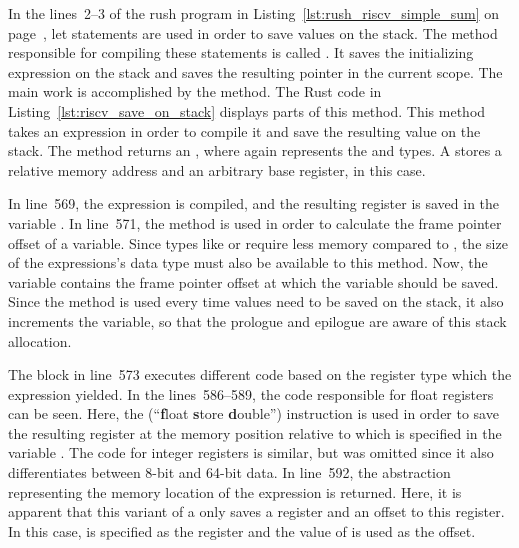 In the lines~2--3 of the rush program in Listing~\ref{lst:rush_riscv_simple_sum} on page~\pageref{lst:rush_riscv_simple_sum}, let statements are used in order to save values on the stack.
The method responsible for compiling these statements is called .
It saves the initializing expression on the stack and saves the resulting pointer in the current scope.
The main work is accomplished by the  method.
The Rust code in Listing~\ref{lst:riscv_save_on_stack} displays parts of this method.%
%
%
This method takes an expression in order to compile it and save the resulting value on the stack.
The method returns an , where  again represents the \qVerb{!} and \qVerb{()} types.
A  stores a relative memory address and an arbitrary base register,  in this case.

In line~569, the expression is compiled, and the resulting register is saved in the variable .
In line~571, the  method is used in order to calculate the frame pointer offset of a variable.
Since types like  or  require less memory compared to , the size of the expressions's data type must also be available to this method.
Now, the  variable contains the frame pointer offset at which the variable should be saved.
Since the  method is used every time values need to be saved on the stack,
it also increments the  variable, so that the prologue and epilogue are aware of this stack allocation.

The  block in line~573 executes different code based on the register type which the expression yielded.
In the lines~586--589, the code responsible for float registers can be seen.
Here, the  (\enquote{\textbf{f}loat \textbf{s}tore \textbf{d}ouble}) instruction is used in order to save the resulting register at the memory position relative to  which is specified in the variable .
The code for integer registers is similar, but was omitted since it also differentiates between 8-bit and 64-bit data.
In line~592, the  abstraction representing the memory location of the expression is returned.
Here, it is apparent that this variant of a  only saves a register and an offset to this register.
In this case,  is specified as the register and the value of  is used as the offset.

